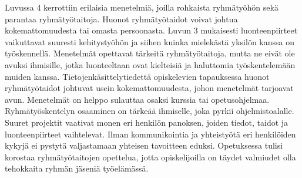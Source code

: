 \documentclass[finnish]{../tktltiki2}
\theoremstyle{definition}
\theoremstyle{remark}
\begin{document}
Luvussa 4 kerrottiin erilaisia menetelmiä, joilla rohkaista ryhmätyöhön sekä parantaa ryhmätyötaitoja. Huonot ryhmätyötaidot voivat johtua kokemattomuudesta tai omasta persoonasta. Luvun 3 mukaisesti luonteenpiirteet vaikuttavat suuresti kehitystyöhön ja siihen kuinka mielekästä yksilön kanssa on työskennellä. Menetelmät opettavat tärkeitä ryhmätyötaitoja, mutta ne eivät ole avuksi ihmisille, jotka luonteeltaan ovat kielteisiä ja haluttomia työskentelemään muiden kanssa. Tietojenkäsittelytiedettä opiskelevien tapauksessa huonot ryhmätyötaidot johtuvat usein kokemattomuudesta, johon menetelmät tarjoavat avun. Menetelmät on helppo sulauttaa osaksi kurssia tai opetusohjelmaa.\\

Ryhmätyöskentelyn osaaminen on tärkeää ihmiselle, joka pyrkii ohjelmistoalalle. Suuret projektit vaativat monen eri henkilön panoksen, joiden tiedot, taidot ja luonteenpiirteet vaihtelevat. Ilman kommunikointia ja yhteistyötä eri henkilöiden kykyjä ei pystytä valjastamaan yhteisen tavoitteen eduksi. Opetuksessa tulisi korostaa ryhmätyötaitojen opettelua, jotta opiskelijoilla on täydet valmiudet olla tehokkaita ryhmän jäseniä työelämässä.


%
%
% 
%



\end{document}
